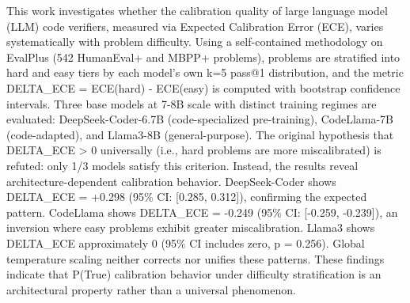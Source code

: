 
This work investigates whether the calibration quality of large language model (LLM) code verifiers, measured via Expected Calibration Error (ECE), varies systematically with problem difficulty. Using a self-contained methodology on EvalPlus (542 HumanEval+ and MBPP+ problems), problems are stratified into hard and easy tiers by each model's own k=5 pass@1 distribution, and the metric DELTA\_ECE = ECE(hard) - ECE(easy) is computed with bootstrap confidence intervals. Three base models at 7-8B scale with distinct training regimes are evaluated: DeepSeek-Coder-6.7B (code-specialized pre-training), CodeLlama-7B (code-adapted), and Llama3-8B (general-purpose). The original hypothesis that DELTA\_ECE > 0 universally (i.e., hard problems are more miscalibrated) is refuted: only 1/3 models satisfy this criterion. Instead, the results reveal architecture-dependent calibration behavior. DeepSeek-Coder shows DELTA\_ECE = +0.298 (95\% CI: [0.285, 0.312]), confirming the expected pattern. CodeLlama shows DELTA\_ECE = -0.249 (95\% CI: [-0.259, -0.239]), an inversion where easy problems exhibit greater miscalibration. Llama3 shows DELTA\_ECE approximately 0 (95\% CI includes zero, p = 0.256). Global temperature scaling neither corrects nor unifies these patterns. These findings indicate that P(True) calibration behavior under difficulty stratification is an architectural property rather than a universal phenomenon.
